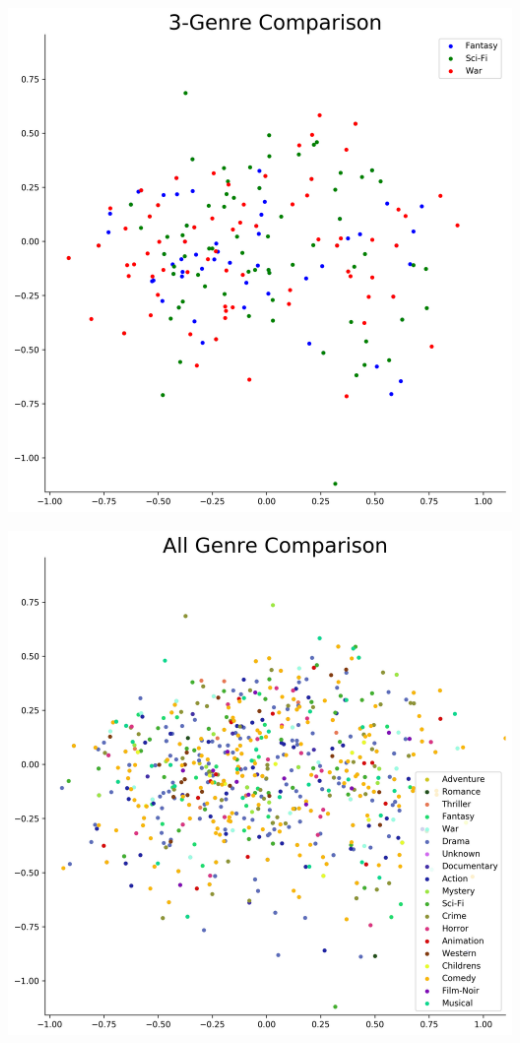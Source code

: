\begin{appendices}
\begin{center}
\begin{minipage}{0.48\linewidth}
\end{minipage}
\vspace{10mm}
\begin{minipage}{0.48\linewidth}
\includegraphics[scale=0.35]{"3-Genre Comparison"}
\end{minipage}
\hfill %
\begin{minipage}{0.48\linewidth}
\includegraphics[scale=0.35]{"All Genre Comparison"}

\end{minipage}
\end{center}
\end{appendices}

